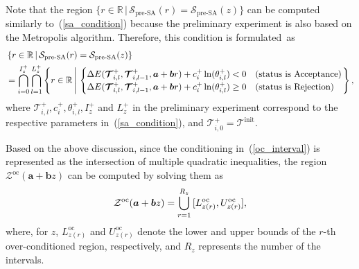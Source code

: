 Note that the region $\{r \in \mathbb{R} \, | \, \mathcal{S}_{\text{pre-SA}}(r) = \mathcal{S}_{\text{pre-SA}}(z)\}$ can be computed similarly to~(\ref{sa_condition}) 
because the preliminary experiment is also based on the Metropolis algorithm. 
Therefore, this condition is formulated~as
\begin{align}
  &\left\{r \in \mathbb{R} \, | \, \mathcal{S}_{\text{pre-SA}}(r) = \mathcal{S}_{\text{pre-SA}}(z)\right\} \notag \\ 
  &= \bigcap_{i=0}^{I_z^+} \bigcap_{l=1}^{L_z^+} \left\{r \in \mathbb{R} \, \Bigg| \, 
  \begin{cases}
    \Delta E(\bm{\mathcal{T}}_{i,l}^{+}, \bm{\mathcal{T}}_{i,l-1}^{+}, \bm{a} + \bm{b}r) + c_i^{+} \ln (\theta_{i,l}^{+}) < 0 & \text{(status is Acceptance)} \\
    \Delta E(\bm{\mathcal{T}}_{i,l}^{+}, \bm{\mathcal{T}}_{i,l-1}^{+}, \bm{a} + \bm{b}r) + c_i^{+} \ln (\theta_{i,l}^{+}) \geq 0 & \text{(status is Rejection)}
  \end{cases} \right\}, \notag
\end{align}
where $\bm{\mathcal{T}}_{i,l}^{+}, c_i^{+}, \theta_{i,l}^{+}, I_z^+$ and $L_z^+$ in the preliminary experiment correspond to the respective parameters in~(\ref{sa_condition}), 
and $\bm{\mathcal{T}}_{i,0}^{+} = \bm{\mathcal{T}}^{\text{init}}$. 

Based on the above discussion, since the conditioning in~(\ref{oc_interval}) is represented as the intersection of multiple quadratic inequalities, 
the region $\mathcal{Z}^{\text{oc}} (\bm{a} + \bm{b}z)$ can be computed by solving them as 
\begin{equation}
  \mathcal{Z}^{\text{oc}} (\bm{a} + \bm{b}z) = \bigcup_{r=1}^{R_z} \, [L_{z {(r)}}^{\text{oc}}, U_{z {(r)}}^{\text{oc}}], \notag
\end{equation}
where, for $z$, $L_{z {(r)}}^{\text{oc}}$ and $U_{z {(r)}}^{\text{oc}}$ denote the lower and upper bounds of the $r$-th over-conditioned region, respectively, 
and $R_z$ represents the number of the intervals.

